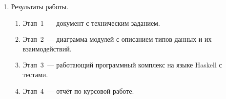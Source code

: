 \begin{enumerate}
\begin{enumerate}[label=\alph*.]
        \item Этап~1~--- утверждённое техническое задание для курсовой работы. Срок: до 17.04.2026.
        \item Этап~2~--- созданная диаграмма типов и модулей. Срок: до 24.04.2026.
        \item Этап~3~--- реализованный проект на Stack на языке программирования Haskell. Срок: до 15.05.2026.
        \item Этап~4~--- защищённый отчёт по курсовой работе. Срок: до 22.05.2026.
    \end{enumerate}
    \item Результаты работы.
    \begin{enumerate}[label=\alph*.]
        \item Этап~1~--- документ с техническим заданием.
        \item Этап~2~--- диаграмма модулей с описанием типов данных и их взаимодействий.
        \item Этап~3~--- работающий программный комплекс на языке Haskell с тестами.
        \item Этап~4~--- отчёт по курсовой работе.
    \end{enumerate}
\end{enumerate}
